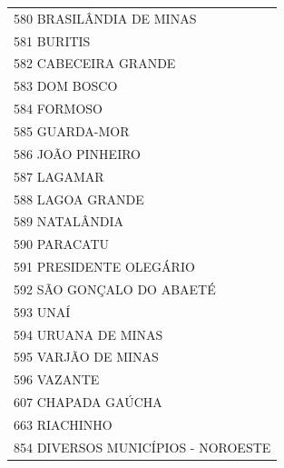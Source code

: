 \documentclass{article}
\begin{document}
\begin{longtable}[c]{m{18cm}}
\multicolumn{1}{l}{ \hspace{2em} 580 BRASILÂNDIA DE MINAS } \\
\multicolumn{1}{l}{ \hspace{2em} 581 BURITIS } \\
\multicolumn{1}{l}{ \hspace{2em} 582 CABECEIRA GRANDE } \\
\multicolumn{1}{l}{ \hspace{2em} 583 DOM BOSCO } \\
\multicolumn{1}{l}{ \hspace{2em} 584 FORMOSO } \\
\multicolumn{1}{l}{ \hspace{2em} 585 GUARDA-MOR } \\
\multicolumn{1}{l}{ \hspace{2em} 586 JOÃO PINHEIRO } \\
\multicolumn{1}{l}{ \hspace{2em} 587 LAGAMAR } \\
\multicolumn{1}{l}{ \hspace{2em} 588 LAGOA GRANDE } \\
\multicolumn{1}{l}{ \hspace{2em} 589 NATALÂNDIA } \\
\multicolumn{1}{l}{ \hspace{2em} 590 PARACATU } \\
\multicolumn{1}{l}{ \hspace{2em} 591 PRESIDENTE OLEGÁRIO } \\
\multicolumn{1}{l}{ \hspace{2em} 592 SÃO GONÇALO DO ABAETÉ } \\
\multicolumn{1}{l}{ \hspace{2em} 593 UNAÍ } \\
\multicolumn{1}{l}{ \hspace{2em} 594 URUANA DE MINAS } \\
\multicolumn{1}{l}{ \hspace{2em} 595 VARJÃO DE MINAS } \\
\multicolumn{1}{l}{ \hspace{2em} 596 VAZANTE } \\
\multicolumn{1}{l}{ \hspace{2em} 607 CHAPADA GAÚCHA } \\
\multicolumn{1}{l}{ \hspace{2em} 663 RIACHINHO } \\
\multicolumn{1}{l}{ \hspace{2em} 854 DIVERSOS MUNICÍPIOS - NOROESTE } \\
\end{longtable}
\end{document}
